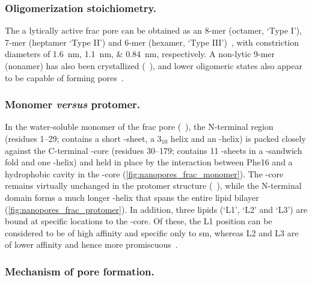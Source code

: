 \subsubsection{Oligomerization stoichiometry.}
%

The a lytically active \gls{frac} pore can be obtained as an 8-mer (octamer, `Type I'), 7-mer (heptamer `Type
II') and 6-mer (hexamer, `Type III')~\cite{Huang-2019}, with constriction diameters of
\SIlist{1.6;1.1;0.84}{\nm}, respectively. A non-lytic 9-mer (nonamer) has also been crystallized
(~\cite{Mechaly-2011}), and lower oligomeric states also appear to be capable of forming
pores~\cite{Rojko-2016}.


\subsubsection{Monomer \textit{versus} protomer.}
%

In the water-soluble monomer of the \gls{frac} pore (~\cite{Tanaka-2015}), the N-terminal region
(residues 1--29; contains a short \tb-sheet, a 3$_10$ helix and an \ta-helix) is packed closely against the
C-terminal \tb-core (residues 30--179; contains 11 \tb-sheets in a \tb-sandwich fold and one \ta-helix) and
held in place by the interaction between Phe16 and a hydrophobic cavity in the \tb-core
(\cref{fig:nanopores_frac_monomer}). The \tb-core remains virtually unchanged in the protomer structure
(~\cite{Tanaka-2015}), while the N-terminal domain forms a much longer \ta-helix that spans the
entire lipid bilayer (\cref{fig:nanopores_frac_protomer}). In addition, three lipids (`L1', `L2' and `L3') are
bound at specific locations to the \tb-core. Of these, the L1 position can be considered to be of high
affinity and specific only to \gls{sm}, whereas L2 and L3 are of lower affinity and hence more
promiscuous~\cite{Tanaka-2015}. 


\subsubsection{Mechanism of pore formation.}
%

